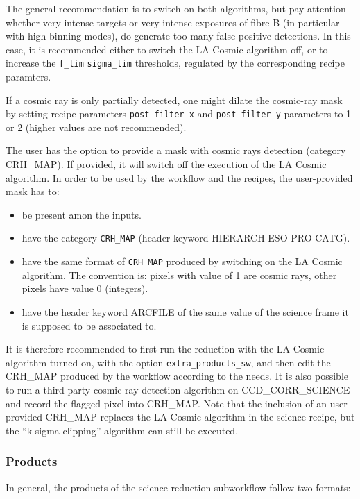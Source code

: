 The general recommendation is to switch on both algorithms, but pay
attention whether very intense targets or very intense exposures of
fibre B (in particular with high binning modes), do generate too many
false positive detections. In this case, it is recommended either to
switch the LA Cosmic algorithm off, or to increase the {\tt f\_lim}
{\tt sigma\_lim} thresholds, regulated by the corresponding recipe paramters.

If a cosmic ray is only partially detected, one might dilate the
cosmic-ray mask by setting recipe parameters {\tt post-filter-x} and
{\tt post-filter-y} parameters to 1 or 2 (higher values are not
recommended).


The user has the option to provide a mask with cosmic rays detection (category CRH\_MAP). If provided, it will
switch off the execution of the LA Cosmic algorithm. In order to be used by the workflow and the recipes, the
user-provided mask has to:
\begin{itemize}
\item be present amon the inputs.
\item have the category {\tt CRH\_MAP} (header keyword HIERARCH ESO PRO CATG).
\item have the same format of {\tt CRH\_MAP} produced by switching on the LA Cosmic algorithm. The convention is: pixels
with value of 1 are cosmic rays, other pixels have value 0 (integers).
\item have the header keyword ARCFILE of the same value of the science frame it is supposed to be associated
  to.
  \end{itemize}
It is therefore recommended to first run the reduction with the LA Cosmic algorithm turned on, with the option
{\tt extra\_products\_sw}, and then edit the CRH\_MAP produced by the workflow according to the needs. It
is also possible to run a third-party cosmic ray detection algorithm on CCD\_CORR\_SCIENCE and record the
flagged pixel into CRH\_MAP.
Note that the inclusion of an user-provided CRH\_MAP replaces the LA Cosmic algorithm in the science recipe,
but the “k-sigma clipping” algorithm can still be executed.


\subsubsection{Products}
\label{sec:products}

In general, the products of the science reduction subworkflow follow two formats:

